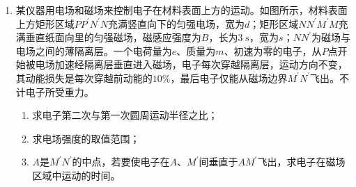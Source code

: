 \begin{enumerate}[leftmargin=0em]
\newpage
\item
{}
某仪器用电场和磁场来控制电子在材料表面上方的运动。如图所示，材料表面上方矩形区域$ PP ^{\prime} N ^{\prime} N $充满竖直向下的匀强电场，宽为$ d $；矩形区域$ NN ^{\prime} M ^{\prime} M $充满垂直纸面向里的匀强磁场，磁感应强度为$ B $，长为$ 3 \ s $，宽为$ s $；$ NN ^{\prime} $为磁场与电场之间的薄隔离层。一个电荷量为$ e $、质量为$ m $、初速为零的电子，从$ P $点开始被电场加速经隔离层垂直进入磁场，电子每次穿越隔离层，运动方向不变，其动能损失是每次穿越前动能的$ 10 \% $，最后电子仅能从磁场边界$ M ^{\prime} N ^{\prime} $飞出。不计电子所受重力。
\begin{enumerate}
\renewcommand{\labelenumi}{\arabic{enumi}.}
\item
求电子第二次与第一次圆周运动半径之比；
\item 
求电场强度的取值范围；
\item 
$ A $是$ M ^{\prime} N ^{\prime} $的中点，若要使电子在$ A $、$ M ^{\prime} $间垂直于$ AM ^{\prime} $飞出，求电子在磁场区域中运动的时间。



\end{enumerate}
\begin{figure}[h!]
\flushright

\end{figure}






\end{enumerate}
